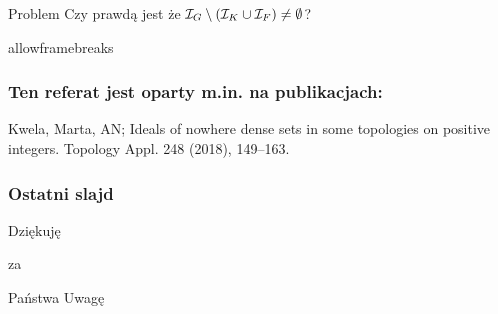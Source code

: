 \documentclass{beamer}
\begin{document}
\begin{frame}

\begin{block}{Problem}
Czy prawdą jest że $\mathcal I_G\setminus (\mathcal I_K\cup \mathcal I_F) \not= \emptyset$?
\end{block}
\end{frame}
\begin{frame}{allowframebreaks}
\frametitle{Ten referat jest oparty m.in. na publikacjach:}
\beamertemplatebookbibitems
\begin{thebibliography}{10}{
 {\sc Kwela, Marta, AN;} {Ideals of nowhere dense sets in some topologies on positive integers.} Topology Appl. 248 (2018), 149–163.
}
\end{thebibliography}
\end{frame}

\begin{frame}\frametitle{Ostatni slajd}
\begin{center}{\Huge Dziękuję}\end{center}
\begin{center}{\Huge za}\end{center}
\begin{center}{\Huge Państwa Uwagę}\end{center}
\end{frame}
\end{document}
